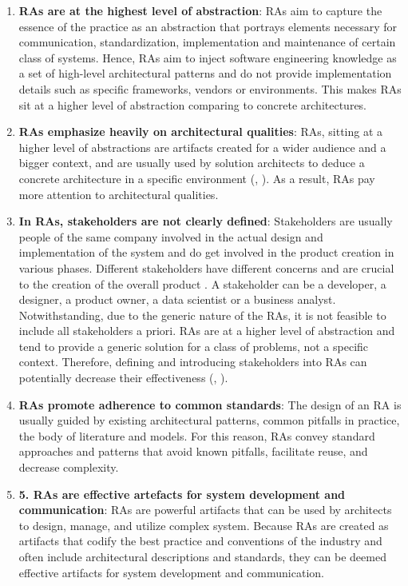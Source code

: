 \documentclass{ieeeaccess}
\begin{document}
\begin{enumerate}
    \item \textbf{RAs are at the highest level of abstraction}: RAs aim to capture the essence of the practice as an abstraction that portrays elements necessary for communication, standardization, implementation and maintenance of certain class of systems. Hence, RAs aim to inject software engineering knowledge as a set of high-level architectural patterns and do not provide implementation details such as specific frameworks, vendors or environments. This makes RAs sit at a higher level of abstraction comparing to concrete architectures.  
   \item \textbf{RAs emphasize heavily on architectural qualities}: RAs, sitting at a higher level of abstractions are artifacts created for a wider audience and a bigger context, and are usually used by solution architects to deduce a concrete architecture in a specific environment (\cite{angelov2008towards}, \cite{stricker2010creating}). As a result, RAs pay more attention to architectural qualities.
   \item \textbf{In RAs, stakeholders are not clearly defined}: Stakeholders are usually people of the same company involved in the actual design and implementation of the system and do get involved in the product creation in various phases. Different stakeholders have different concerns and are crucial to the creation of the overall product \cite{geerdink2013reference}. A stakeholder can be a developer, a designer, a product owner, a data scientist or a business analyst. Notwithstanding, due to the generic nature of the RAs, it is not feasible to include all stakeholders a priori. RAs are at a higher level of abstraction and tend to provide a generic solution for a class of problems, not a specific context. Therefore, defining and introducing stakeholders into RAs can potentially decrease their effectiveness (\cite{AtaeiACIS}, \cite{Chang}).
   \item \textbf{RAs promote adherence to common standards}: The design of an RA is usually guided by existing architectural patterns, common pitfalls in practice, the body of literature and models. For this reason, RAs convey standard approaches and patterns that avoid known pitfalls, facilitate reuse, and decrease complexity. 
   \item \textbf{5.	RAs are effective artefacts for system development and communication}: RAs are powerful artifacts that can be used by architects to design, manage, and utilize complex system. Because RAs are created as artifacts that codify the best practice and conventions of the industry and often include architectural descriptions and standards, they can be deemed effective artifacts for system development and communication. 
\end{enumerate}
\end{document}
